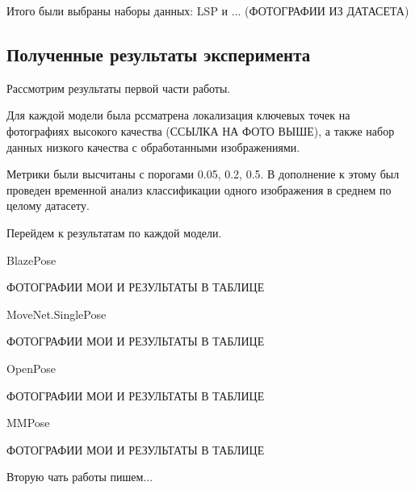 Итого были выбраны наборы данных: LSP и ... (ФОТОГРАФИИ ИЗ ДАТАСЕТА)

\subsection{Полученные результаты эксперимента}

Рассмотрим результаты первой части работы.

Для каждой модели была рссматрена локализация ключевых точек на фотографиях высокого качества (ССЫЛКА НА ФОТО ВЫШЕ), а также набор данных низкого качества с обработанными изображениями. 

Метрики были высчитаны с порогами 0.05, 0.2, 0.5. В дополнение к этому был проведен временной анализ классификации одного изображения в среднем по целому датасету.

Перейдем к результатам по каждой модели.

\begin{large}
BlazePose

ФОТОГРАФИИ МОИ И РЕЗУЛЬТАТЫ В ТАБЛИЦЕ

MoveNet.SinglePose

ФОТОГРАФИИ МОИ И РЕЗУЛЬТАТЫ В ТАБЛИЦЕ

OpenPose

ФОТОГРАФИИ МОИ И РЕЗУЛЬТАТЫ В ТАБЛИЦЕ

MMPose

ФОТОГРАФИИ МОИ И РЕЗУЛЬТАТЫ В ТАБЛИЦЕ
\end{large}

Вторую чать работы пишем...

\newpage